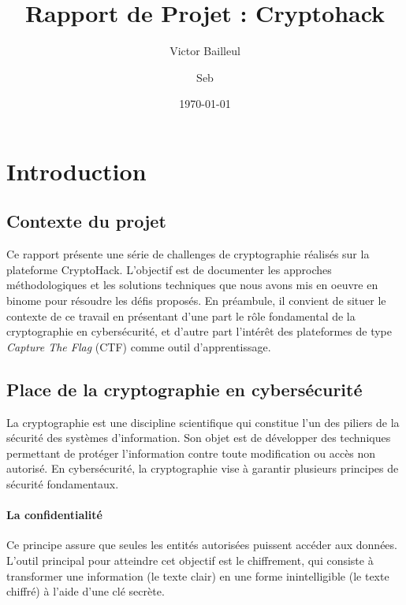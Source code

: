 \documentclass[12pt, a4paper]{article}
\title{Rapport de Projet : Cryptohack}
\author{Victor Bailleul \and Seb}
\date{\today} %
\begin{document}
    \maketitle

    \tableofcontents

    \newpage %

    \section{Introduction}

    \subsection{Contexte du projet}
    Ce rapport présente une série de challenges de cryptographie réalisés sur la
    plateforme CryptoHack. L'objectif est de documenter les approches
    méthodologiques et les solutions techniques que nous avons mis en oeuvre en
    binome pour résoudre les défis proposés. En préambule, il convient de situer
    le contexte de ce travail en présentant d'une part le rôle fondamental de la
    cryptographie en cybersécurité, et d'autre part l'intérêt des plateformes de
    type \textit{Capture The Flag} (CTF) comme outil d'apprentissage.

    \subsection{Place de la cryptographie en cybersécurité}
    La cryptographie est une discipline scientifique qui constitue l'un des
    piliers de la sécurité des systèmes d'information. Son objet est de
    développer des techniques permettant de protéger l'information contre toute
    modification ou accès non autorisé. En cybersécurité, la cryptographie vise
    à garantir plusieurs principes de sécurité fondamentaux.

    \paragraph{La confidentialité}
    Ce principe assure que seules les entités autorisées puissent accéder aux
    données. L'outil principal pour atteindre cet objectif est le chiffrement,
    qui consiste à transformer une information (le texte clair) en une forme
    inintelligible (le texte chiffré) à l'aide d'une clé secrète.
\end{document}

